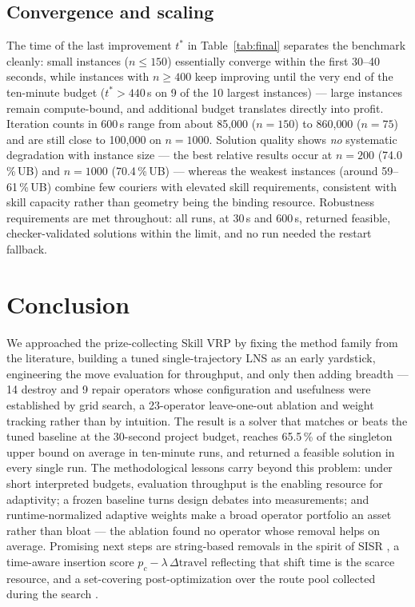 \documentclass[10pt, a4paper]{article}
\newcommand{\ub}{\%\,UB}
\begin{document}
\subsection{Convergence and scaling}
The time of the last improvement $t^{*}$ in Table~\ref{tab:final} separates
the benchmark cleanly: small instances ($n\le 150$) essentially converge
within the first 30--40 seconds, while instances with $n\ge 400$ keep
improving until the very end of the ten-minute budget ($t^{*}>440\,$s on 9
of the 10 largest instances) --- large instances remain compute-bound, and
additional budget translates directly into profit. Iteration counts in
600\,s range from about 85{,}000 ($n=150$) to 860{,}000 ($n=75$) and are
still close to 100{,}000 on $n=1000$. Solution quality shows \emph{no}
systematic degradation with instance size --- the best relative results
occur at $n=200$ (74.0\,\ub) and $n=1000$ (70.4\,\ub) --- whereas the
weakest instances (around 59--61\,\ub) combine few couriers with elevated
skill requirements, consistent with skill capacity rather than geometry
being the binding resource. Robustness requirements are met throughout: all
runs, at 30\,s and 600\,s, returned feasible, checker-validated solutions
within the limit, and no run needed the restart fallback.

\section{Conclusion}

We approached the prize-collecting Skill VRP by fixing the method family
from the literature, building a tuned single-trajectory LNS as an early
yardstick, engineering the move evaluation for throughput, and only then
adding breadth --- 14 destroy and 9 repair operators whose configuration and
usefulness were established by grid search, a 23-operator leave-one-out
ablation and weight tracking rather than by intuition. The result is a
solver that matches or beats the tuned baseline at the 30-second project
budget, reaches 65.5\,\% of the singleton upper bound on average in
ten-minute runs, and returned a feasible solution in every single run. The
methodological lessons carry beyond this problem: under short interpreted
budgets, evaluation throughput is the enabling resource for adaptivity; a
frozen baseline turns design debates into measurements; and
runtime-normalized adaptive weights make a broad operator portfolio an
asset rather than bloat --- the ablation found no operator whose removal
helps on average. Promising next steps are string-based removals in the
spirit of SISR \cite{christiaens2020}, a time-aware insertion score
$p_c-\lambda\,\Delta\mathrm{travel}$ reflecting that shift time is the
scarce resource, and a set-covering post-optimization over the route pool
collected during the search \cite{hu2014}.
\end{document}
